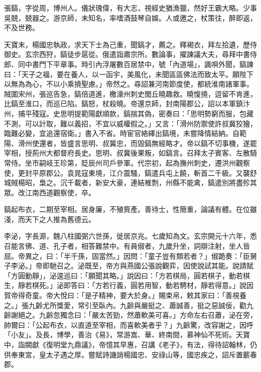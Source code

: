 \begin{pinyinscope}
 張鎬，字從周，博州人。儀狀瑰偉，有大志，視經史猶漁獵，然好王霸大略。少事吳兢，兢器之。游京師，未知名，率嗜酒鼓琴自娛。人或邀之，杖策往，醉即返，不及世務。



 天寶末，楊國忠執政，求天下士為己重，聞鎬才，薦之。釋褐衣，拜左拾遺，歷侍御史。玄宗西狩，鎬徒步扈從。俄遣詣肅宗所。數論事，擢諫議大夫，尋拜中書侍郎、同中書門下平章事。時引內浮屠數百居禁中，號「內道場」，諷唄外聞，鎬諫曰：「天子之福，要在養人，以一函宇，美風化，未聞區區佛法而致太平。願陛下以無為為心，不以小乘撓聖慮。」帝然之。尋詔兼河南節度使，都統淮南諸軍事。賊圍宋州，張巡告急，鎬倍道進，檄濠州刺史閭丘曉趣救。曉愎撓，逗留不肯進，比鎬至淮口，而巡已陷。鎬怒，杖殺曉。帝還京師，封南陽郡公，詔以本軍鎮汴州，捕平殘寇。史思明提範陽獻順款，鎬揣其偽，密奏曰：「思明勢窮而服，包藏不測，可以計取，難以義招，不宜以威權假之。」又言：「滑州防禦使許叔冀狡獪，臨難必變，宜追還宿衛。」書入不省。時宦官絡繹出鎬境，未嘗降情結納。自範陽、滑州使還者，皆盛言思明、叔冀忠，而毀鎬無經略才。帝以鎬不切事機，遂罷宰相，授荊州大都督府長史。思明、叔冀後果叛，如鎬言。召拜太子賓客、左散騎常侍。坐市嗣岐王珍第，貶辰州司戶參軍。代宗初，起為撫州刺史，遷洪州觀察使，更封平原郡公。袁晁寇東境，江介震騷，鎬遣兵屯上饒，斬首二千級。又襲舒城賊楊昭，梟之。沉千載者，新安大豪，連結椎剽，州縣不能禽，鎬遣別將盡殄其眾。改江南西道觀察使，卒。



 鎬起布衣，二期至宰相。居身廉，不殖貲產。善待士，性簡重，論議有體。在位雖淺，而天下之人推為舊德云。



 李泌，字長源，魏八柱國弼六世孫，徙居京兆。七歲知為文。玄宗開元十六年，悉召能言佛、道、孔子者，相答難禁中。有員俶者，九歲升坐，詞辯注射，坐人皆屈。帝異之，曰：「半千孫，固當然。」因問：「童子豈有類若者？」俶跪奏：「臣舅子李泌。」帝即馳召之。泌既至，帝方與燕國公張說觀弈，因使說試其能。說請賦「方圓動靜」，泌逡巡曰：「願聞其略。」說因曰：「方若棋局，圓若棋子，動若棋生，靜若棋死。」泌即答曰：「方若行義，圓若用智，動若騁材，靜若得意。」說因賀帝得奇童。帝大悅曰：「是子精神，要大於身。」賜束帛，敕其家曰：「善視養之。」張九齡尤所獎愛，常引至臥內。九齡與嚴挺之、蕭誠善，挺之惡誠佞，勸九齡謝絕之。九齡忽獨念曰：「嚴太苦勁，然蕭軟美可喜。」方命左右召蕭，泌在旁，帥爾曰：「公起布衣，以直道至宰相，而喜軟美者乎？」九齡驚，改容謝之，因呼「小友」。及長，博學，善治《易》，常游嵩、華、終南間，慕神仙不死術。天寶中，詣闕獻《復明堂九鼎議》，帝憶其早惠，召講《老子》，有法，得待詔翰林，仍供奉東宮，皇太子遇之厚。嘗賦詩譏誚楊國忠、安祿山等，國忠疾之，詔斥置蘄春郡。




\end{pinyinscope}
